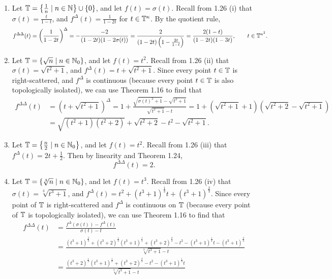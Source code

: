 \documentclass[nonumber]{homework}
\begin{document}
	\begin{enumerate}[label={\bf(\roman*)}]
		\item Let $\mathbb{T} = \left\{\frac{1}{n} \mid n \in \mathbb{N}\right\}\cup\{0\}$, and let $f(t) = \sigma(t)$. Recall from 1.26 (i) that $\sigma(t) = \frac{t}{1-t}$, and $f^\Delta(t) = \frac{1}{1-2t}$ for $t \in \mathbb{T}^\kappa$. By the quotient rule,
		\begin{equation*}
			f^{\Delta\Delta}(t) = \left(\frac{1}{1-2t}\right)^\Delta = -\frac{-2}{(1-2t)(1-2\sigma(t))} = \frac{2}{(1-2t)\left(1-\frac{2t}{1-t}\right)} = \frac{2(1-t)}{(1-2t)(1-3t)}, \qquad t \in \mathbb{T}^{\kappa^2}.
		\end{equation*}
		
		\item Let $\mathbb{T} = \{\sqrt{n}\mid n \in \mathbb{N}_0\}$, and let $f(t) = t^2$. Recall from 1.26 (ii) that $\sigma(t) = \sqrt{t^2+1}$, and $f^\Delta(t) = t + \sqrt{t^2+1}$. Since every point $t\in\mathbb{T}$ is right-scattered, and $f^\Delta$ is continuous (because every point $t\in\mathbb{T}$ is also topologically isolated), we can use Theorem 1.16 to find that
		\begin{align*}
			f^{\Delta\Delta}(t) &= \left(t + \sqrt{t^2+1}\right)^\Delta = 1 + \frac{\sqrt{\sigma(t)^2+1} - \sqrt{t^2+1}}{\sqrt{t^2+1}-t} = 1 + \left(\sqrt{t^2+1}+1\right)\left(\sqrt{t^2+2} - \sqrt{t^2+1}\right)\\
			&= \sqrt{(t^2+1)(t^2+2)} + \sqrt{t^2+2} - t^2 - \sqrt{t^2+1}.
		\end{align*}
		
		\item Let $\mathbb{T} = \left\{\frac{n}{2} \mid n \in \mathbb{N}_0\right\}$, and let $f(t) = t^2$. Recall from 1.26 (iii) that $f^\Delta(t) = 2t+\frac{1}{2}$. Then by linearity and Theorem 1.24,
		\begin{equation*}
			f^{\Delta\Delta}(t) = 2.
		\end{equation*}
		
		\item Let $\mathbb{T} = \{\sqrt[3]{n} \mid n \in \mathbb{N}_0\}$, and let $f(t) = t^3$. Recall from 1.26 (iv) that $\sigma(t) = \sqrt[3]{t^3+1}$, and $f^\Delta(t) = t^2 + (t^3+1)^\frac{1}{3}t + (t^3+1)^\frac{2}{3}$. Since every point of $\mathbb{T}$ is right-scattered and $f^\Delta$ is continuous on $\mathbb{T}$ (because every point of $\mathbb{T}$ is topologically isolated), we can use Theorem 1.16 to find that
		\begin{align*}
			f^{\Delta\Delta}(t) &= \frac{f^\Delta(\sigma(t)) - f^\Delta(t)}{\sigma(t)-t} \\
			&= \frac{(t^3+1)^\frac{2}{3} + (t^3+2)^\frac{1}{3}(t^3+1)^\frac{1}{3} + (t^3+2)^\frac{2}{3} - t^2 - (t^3+1)^\frac{1}{3}t - (t^3+1)^\frac{2}{3}}{\sqrt[3]{t^3+1} - t} \\
			&= \frac{(t^3+2)^\frac{1}{3}(t^3+1)^\frac{1}{3} + (t^3+2)^\frac{2}{3} - t^2 - (t^3+1)^\frac{1}{3}t}{\sqrt[3]{t^3+1} - t}
		\end{align*} 
	\end{enumerate}
	
\end{document}
